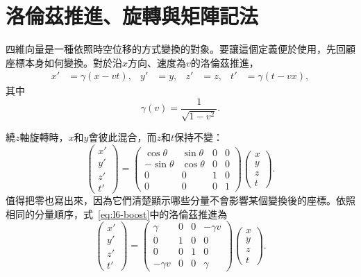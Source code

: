 \section{洛倫茲推進、旋轉與矩陣記法}

四維向量是一種依照時空位移的方式變換的對象。要讓這個定義便於使用，先回顧座標本身如何變換。對於沿\(x\)方向、速度為\(v\)的洛倫茲推進，
\begin{align}
  x'&=\gamma(x-vt), & y'&=y, & z'&=z,
  & t'&=\gamma(t-vx),                                      \label{eq:l6-boost}
\end{align}
其中
\begin{equation}
  \gamma(v)=\frac{1}{\sqrt{1-v^2}}.
\end{equation}

\begin{classroomqa}
\end{classroomqa}

繞\(z\)軸旋轉時，\(x\)和\(y\)會彼此混合，而\(z\)和\(t\)保持不變：
\begin{equation}
\begin{pmatrix}
  x'\\ y'\\ z'\\ t'
\end{pmatrix}
=
\begin{pmatrix}
  \cos\theta & \sin\theta & 0 & 0\\
  -\sin\theta & \cos\theta & 0 & 0\\
  0 & 0 & 1 & 0\\
  0 & 0 & 0 & 1
\end{pmatrix}
\begin{pmatrix}
  x\\ y\\ z\\ t
\end{pmatrix}.
\end{equation}
值得把零也寫出來，因為它們清楚顯示哪些分量不會影響某個變換後的座標。依照相同的分量順序，式~\eqref{eq:l6-boost}中的洛倫茲推進為
\begin{equation}
\begin{pmatrix}
  x'\\ y'\\ z'\\ t'
\end{pmatrix}
=
\begin{pmatrix}
  \gamma & 0 & 0 & -\gamma v\\
  0 & 1 & 0 & 0\\
  0 & 0 & 1 & 0\\
  -\gamma v & 0 & 0 & \gamma
\end{pmatrix}
\begin{pmatrix}
  x\\ y\\ z\\ t
\end{pmatrix}.
\end{equation}

